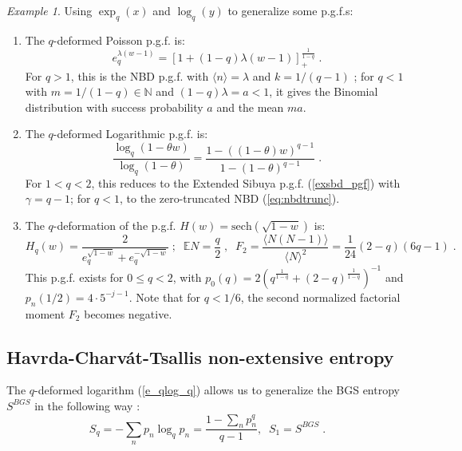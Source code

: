 \documentclass[a4paper,12pt]{amsart}
\newcommand{\E}{\mathbb{E}}
\newcommand{\N}{\mathbb{N}}
\theoremstyle{definition}
\theoremstyle{remark}
\newtheorem{Example}{Example}[section]
\begin{document}
\begin{Example}
Using $\exp_q(x)$ and $\log_q(y)$ to generalize some p.g.f.{}s:
\begin{enumerate} [label=(\roman*), leftmargin=*]
\item The $q$-deformed Poisson p.g.f. is:
    \begin{equation}\label{qPoiss}
 e_q^{\lambda(w-1)}=
\left[1+(1-q)\lambda(w-1)\right]_{+}^{\frac{1}{1-q}}\;.   
\end{equation}
For $q>1$, this is the NBD p.g.f. with $\langle n \rangle =\lambda$ and $k=1/(q-1)$ \cite{Tsallis:2009zex}; for $q<1$ with $m=1/(1-q)\in \N$ and $(1-q)\lambda=a<1$, it gives the Binomial distribution with success probability $a$ and the mean $ma$.

\item  The $q$-deformed Logarithmic p.g.f. is:
\begin{equation}
\frac{\log_q(1-\theta w)}{\log_q(1-\theta)}=
\frac{1-((1-\theta ) w)^{q-1}}{1-(1-\theta )^{q-1}}\;.
\end{equation}
For $1<q<2$, this reduces to the Extended Sibuya p.g.f. (\ref{exsbd_pgf}) with $\gamma=q-1$; for $q<1$, to the zero-truncated NBD (\ref{eq:nbdtrunc}).

\item The $q$-deformation of the p.g.f. $H(w) = \text{sech}(\sqrt{1-w})$ is:
\begin{equation}\label{qsechpgf}
H_q(w) = \frac{2}{e_q^{\sqrt{1-w}}+e_q^{-\sqrt{1-w}}}\;;\;\; \E N =\frac{q}{2}\;,\;\;F_2 =
\frac{\langle N (N-1) \rangle}{\langle N \rangle^2}=\frac{1}{24} (2-q) (6 q-1)\;.
\end{equation}
This p.g.f. exists for $0\leq q <2$, with 
$p_0(q)=2(q^{\frac{1}{1-q}}+(2-q)^{\frac{1}{1-q}})^{-1}$
and $p_n(1/2)=4\cdot 5^{-j-1}$.
Note that for $q<1/6$, the second normalized factorial moment $F_2$ becomes negative.
\end{enumerate}
\end{Example}

\subsection{Havrda-Charv\'at-Tsallis non-extensive entropy}
The $q$-deformed logarithm (\ref{e_qlog_q}) allows us to generalize the BGS entropy $S^{BGS}$  in the following way \cite{Tsallis:1987eu, HCh:1967}:
\begin{equation}\label{Tsalent}
S_q=-\sum_n p_n\log_q p_n=\frac{1-\sum_n p_n^q}{q-1},\;\; S_1=S^{BGS}  \;.
\end{equation}
\end{document}

